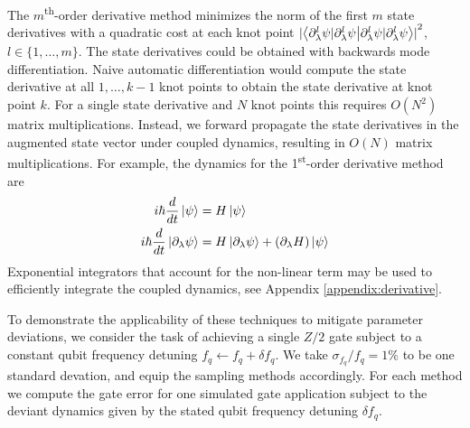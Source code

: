 The $m$\textsuperscript{th}-order
derivative method minimizes the norm of the first $m$
state derivatives with a quadratic cost at each knot point
${\lvert \braket{\partial^{l}_{\lambda} \psi | \partial^{l}_{\lambda} \psi}
  \rvert}^{2}$, $l \in \{1, \dots, m\}$.
The state derivatives could be obtained with backwards mode differentiation.
Naive automatic differentiation would compute
the state derivative at all $1, \dots, k - 1$ knot points
to obtain the state derivative at knot point $k$.
For a single state derivative and $N$ knot points this
requires $O(N^2)$ matrix multiplications.
Instead, we forward propagate the state derivatives in the
augmented state vector under coupled dynamics, resulting in
$O(N)$ matrix multiplications. For example, the dynamics
for the 1\textsuperscript{st}-order derivative method are
\begin{align}
  i \hbar \frac{d}{dt} \ket{\psi} &= H \ket{\psi}\\
  i \hbar \frac{d}{dt} \ket{\partial_{\lambda}\psi} &=
  H \ket{\partial_{\lambda} \psi} +
  (\partial_{\lambda} H) \ket{\psi}
\end{align}
Exponential integrators that account for the non-linear
term may be used to efficiently integrate the coupled dynamics,
see Appendix \ref{appendix:derivative}.

To demonstrate the applicability of these techniques
to mitigate parameter deviations,
we consider the task of achieving a single $Z/2$
gate subject to a constant qubit frequency detuning
$f_{q} \gets f_{q} + \delta f_{q}$.
We take $\sigma_{f_{q}} / f_{q} = 1\%$ to be one standard devation, and equip
the sampling methods accordingly. For each method we compute the gate error for
one simulated gate application subject to the deviant dynamics given by the
stated qubit frequency detuning $\delta f_{q}$.

